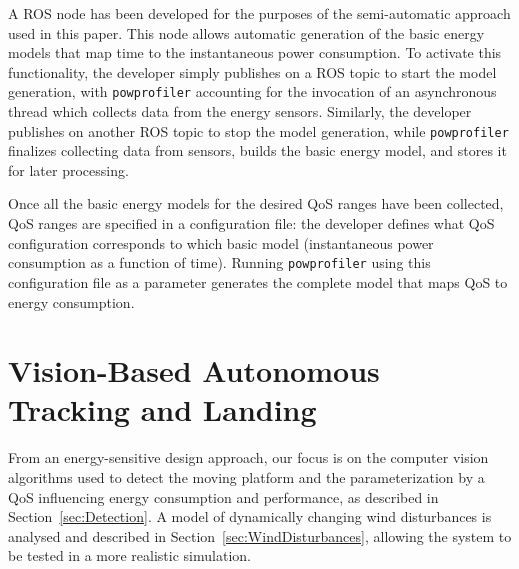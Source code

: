 \documentclass[conference]{IEEEtran}
\newcommand{\stt}[1]{{\small\tt #1}} %
\newcommand{\powprof}{\stt{powprofiler}}
\begin{document}
A ROS node has been developed for the purposes of the semi-automatic %
approach used in this paper. This node allows automatic
generation of the basic energy models that map time to the
instantaneous power consumption. To activate this functionality, the developer simply publishes on a ROS
topic to start the model generation, with \powprof{} accounting for
the invocation of an asynchronous thread which collects data from the
energy sensors. Similarly, the developer publishes on another ROS topic to
stop the model generation, while \powprof{} finalizes collecting data from
sensors, builds the basic energy model, and stores it for later processing.

Once all the basic energy models for the desired QoS ranges have been
collected, QoS ranges are specified in a configuration file: the developer defines
what QoS configuration corresponds to which basic model
(instantaneous power consumption as a function of time). Running
\powprof{} using this configuration file as a parameter generates the
complete model that maps QoS to energy consumption.

\section{Vision-Based Autonomous Tracking and Landing}
\label{sec:landing}

From an energy-sensitive design
approach, our focus is on the computer vision algorithms used to
detect the moving platform and the parameterization by a QoS
influencing energy consumption and performance, as described in
Section~\ref{sec:Detection}. 
A model of
dynamically changing wind disturbances is analysed and described in
Section~\ref{sec:WindDisturbances}, allowing the system to be tested
in a more realistic simulation.
\end{document}

